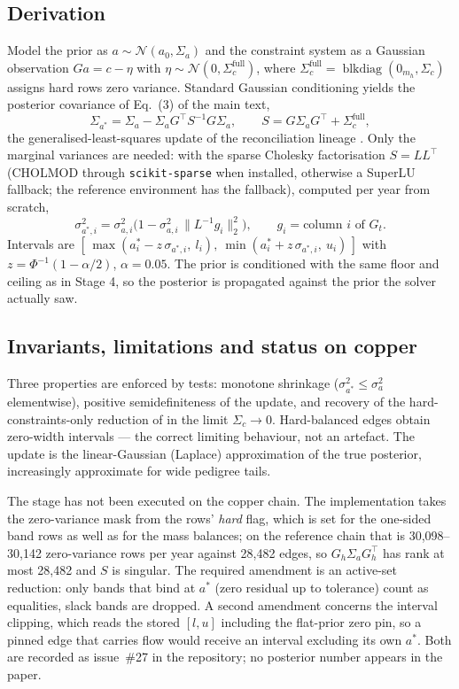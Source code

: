 \documentclass[11pt]{article}
\begin{document}
\subsection{Derivation}
Model the prior as $a \sim \mathcal{N}(a_0, \Sigma_a)$ and the constraint
system as a Gaussian observation $G a = c - \eta$ with $\eta \sim
\mathcal{N}(0, \Sigma_c^{\mathrm{full}})$, where
$\Sigma_c^{\mathrm{full}} = \operatorname{blkdiag}(0_{m_h}, \Sigma_c)$ assigns
hard rows zero variance. Standard Gaussian conditioning yields the posterior
covariance of Eq.~(3) of the main text,
\begin{equation}
\Sigma_{a^*} = \Sigma_a - \Sigma_a G^\top S^{-1} G \Sigma_a,
\qquad S = G \Sigma_a G^\top + \Sigma_c^{\mathrm{full}},
\end{equation}
the generalised-least-squares update of the reconciliation lineage
\citep{byron1978, vanderploeg1982}. Only the marginal variances are needed:
with the sparse Cholesky factorisation $S = L L^\top$ (CHOLMOD through
\texttt{scikit-sparse} when installed, otherwise a SuperLU fallback; the
reference environment has the fallback), computed per year from scratch,
\begin{equation}
\sigma^2_{a^*\!,i} = \sigma^2_{a,i}\bigl(1 - \sigma^2_{a,i}\,
\| L^{-1} g_i \|_2^2\bigr), \qquad g_i = \text{column } i \text{ of } G_t.
\end{equation}
Intervals are $[\,\max(a^*_i - z\,\sigma_{a^*\!,i},\ l_i),\
\min(a^*_i + z\,\sigma_{a^*\!,i},\ u_i)\,]$ with
$z = \Phi^{-1}(1-\alpha/2)$, $\alpha = 0.05$. The prior is conditioned with
the same floor and ceiling as in Stage 4, so the posterior is propagated
against the prior the solver actually saw.

\subsection{Invariants, limitations and status on copper}
Three properties are enforced by tests: monotone shrinkage
($\sigma^2_{a^*} \le \sigma^2_a$ elementwise), positive semidefiniteness of
the update, and recovery of the hard-constraints-only reduction of
\citet{byron1978} in the limit $\Sigma_c \to 0$. Hard-balanced edges obtain
zero-width intervals --- the correct limiting behaviour, not an artefact.
The update is the linear-Gaussian (Laplace) approximation of the true
posterior, increasingly approximate for wide pedigree tails.

The stage has not been executed on the copper chain. The implementation
takes the zero-variance mask from the rows' \emph{hard} flag, which is set
for the one-sided band rows as well as for the mass balances; on the
reference chain that is 30{,}098--30{,}142 zero-variance rows per year
against 28{,}482 edges, so $G_h\Sigma_aG_h^\top$ has rank at most 28{,}482
and $S$ is singular. The required amendment is an active-set reduction:
only bands that bind at $a^*$ (zero residual up to tolerance) count as
equalities, slack bands are dropped. A second amendment concerns the
interval clipping, which reads the stored $[l,u]$ including the flat-prior
zero pin, so a pinned edge that carries flow would receive an interval
excluding its own $a^*$. Both are recorded as issue~\#27 in the repository;
no posterior number appears in the paper.
\end{document}
